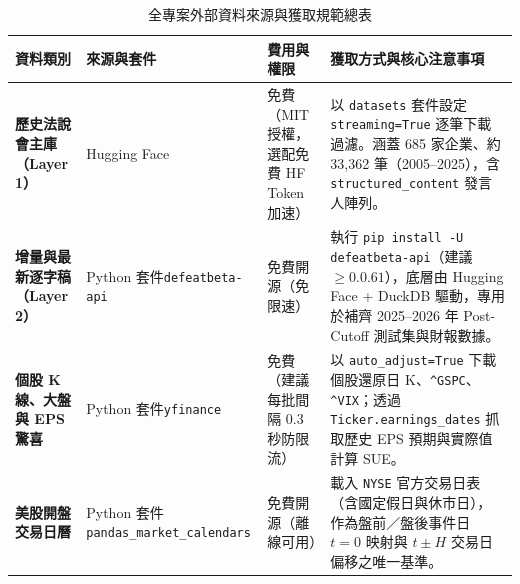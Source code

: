 \documentclass[11pt, a4paper]{article}
\begin{document}
\begin{table}[H]
\centering
\caption{全專案外部資料來源與獲取規範總表}
\label{tab:data_sources}
\footnotesize
\begin{tabularx}{\textwidth}{>{\bfseries}P{2.4cm} P{4.3cm} P{2.4cm} Y}
\toprule
資料類別 & 來源與套件 & 費用與權限 & 獲取方式與核心注意事項 \\
\midrule
歷史法說會主庫（Layer 1） &
Hugging Face &
免費（MIT 授權，選配免費 HF Token 加速） &
以 \texttt{datasets} 套件設定 \texttt{streaming=True} 逐筆下載過濾。涵蓋 685 家企業、約 33,362 筆（2005--2025），含 \texttt{structured\_content} 發言人陣列。 \\
\midrule
增量與最新逐字稿（Layer 2） &
Python 套件\newline\texttt{defeatbeta-api} &
免費開源（免限速） &
執行 \texttt{pip install -U defeatbeta-api}（建議 $\ge 0.0.61$），底層由 Hugging Face + DuckDB 驅動，專用於補齊 2025--2026 年 Post-Cutoff 測試集與財報數據。 \\
\midrule
個股 K 線、大盤與 EPS 驚喜 &
Python 套件\newline\texttt{yfinance} &
免費（建議每批間隔 0.3 秒防限流） &
以 \texttt{auto\_adjust=True} 下載個股還原日 K、\texttt{\^{}GSPC}、\texttt{\^{}VIX}；透過 \texttt{Ticker.earnings\_dates} 抓取歷史 EPS 預期與實際值計算 SUE。 \\
\midrule
美股開盤交易日曆 &
Python 套件\newline\texttt{pandas\_market\_calendars} &
免費開源（離線可用） &
載入 \texttt{NYSE} 官方交易日表（含國定假日與休市日），作為盤前／盤後事件日 $t=0$ 映射與 $t\pm H$ 交易日偏移之唯一基準。 \\
\bottomrule
\end{tabularx}
\end{table}
\end{document}
